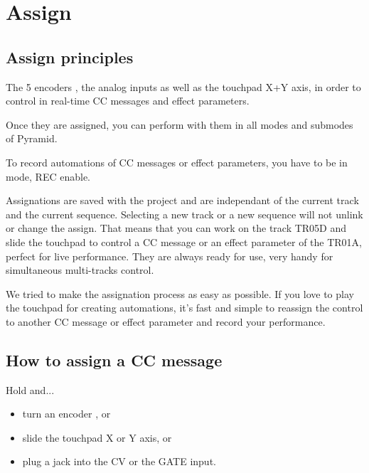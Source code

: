 \chapter{Assign}

\section{Assign principles}

The 5 encoders \encodersicon{}, the analog inputs as well as the touchpad \touchpadicon{} X+Y axis, in order to control in real-time CC messages and effect parameters.

Once they are assigned, you can perform with them in all modes and submodes of Pyramid.

To record automations of CC messages or effect parameters, you have to be in  mode, REC enable.

Assignations are saved with the project and are independant of the current track and the current sequence. Selecting a new track or a new sequence will not unlink or change the assign. That means that you can work on the track TR05D and slide the touchpad to control a CC message or an effect parameter of the TR01A, perfect for live performance. They are always ready for use, very handy for simultaneous multi-tracks control.

We tried to make the assignation process as easy as possible. If you love to play the touchpad for creating automations, it's fast and simple to reassign the control to another CC message or effect parameter and record your performance.




\section{How to assign a CC message}

Hold  and...

\begin{itemize}
\item turn an encoder \encodersicon{}, or
\item slide the touchpad \touchpadicon{} X or Y axis, or
\item plug a jack into the CV or the GATE input.
\end{itemize}

